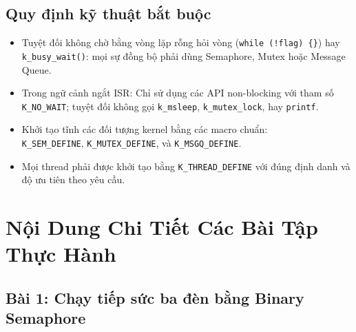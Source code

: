 \subsection{Quy định kỹ thuật bắt buộc}
\begin{itemize}
    \item Tuyệt đối không chờ bằng vòng lặp rỗng hỏi vòng (\texttt{while (!flag) \{\}}) hay \texttt{k\_busy\_wait()}: mọi sự đồng bộ phải dùng Semaphore, Mutex hoặc Message Queue.
    \item Trong ngữ cảnh ngắt ISR: Chỉ sử dụng các API non-blocking với tham số \texttt{K\_NO\_WAIT}; tuyệt đối không gọi \texttt{k\_msleep}, \texttt{k\_mutex\_lock}, hay \texttt{printf}.
    \item Khởi tạo tĩnh các đối tượng kernel bằng các macro chuẩn: \\
    \texttt{K\_SEM\_DEFINE}, \texttt{K\_MUTEX\_DEFINE}, và \texttt{K\_MSGQ\_DEFINE}.
    \item Mọi thread phải được khởi tạo bằng \texttt{K\_THREAD\_DEFINE} với đúng định danh và độ ưu tiên theo yêu cầu.
\end{itemize}

\newpage
\section{Nội Dung Chi Tiết Các Bài Tập Thực Hành}

\subsection{Bài 1: Chạy tiếp sức ba đèn bằng Binary Semaphore}

